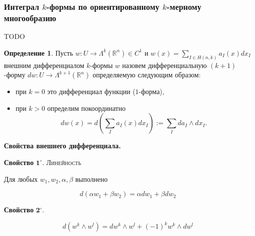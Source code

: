 \documentclass[a5paper]{article}
\newcounter{through}
\theoremstyle{plain}
\theoremstyle{definition}
\newtheorem{definition}[through]{Определение}
\numberwithin{through}{section}
\numberwithin{equation}{section}
\begin{document}
\subsubsection{Интеграл $k$-формы по ориентированному $k$-мерному многообразию}

TODO

\begin{definition}
	Пусть $w : U \to \Lambda^k(\mathbb{R}^n) \in C^1$ и $w(x) = \sum\limits_{I \in H(n, k)} a_I (x) dx_I$
	внешним дифференциалом $k$-формы $w$ назовем дифференциальную $(k+1)$-форму $dw : U \to \Lambda^{k+1}(\mathbb{R}^n)$
	определяемую следующим образом:
	\begin{itemize}
		\item
		при $k = 0$ это дифференциал функции ($1$-форма),
		
		\item 
		при $k > 0$ определим покоординатно
		\[ dw(x) = d \left( \sum_I a_I(x)dx_I \right) := \sum_I da_I \wedge dx_I.  \]
	\end{itemize}
\end{definition}
{\bf Свойства внешнего дифференциала.}

\medskip
{\bf Свойство} $\mathbf{1^\circ.}$
{\textsc{Линейность}}

Для любых $w_1, w_2, \alpha, \beta$ выполнено

\begin{equation*}
	d(\alpha w_1 + \beta w_2) = \alpha dw_1 + \beta dw_2
\end{equation*}

\medskip
{\bf Свойство} $\mathbf{2^\circ.}$

\begin{equation*}
	d(w^k \wedge w^l)  = dw^k \wedge w^l + (-1)^k w^k \wedge dw^l
\end{equation*}
\end{document}
